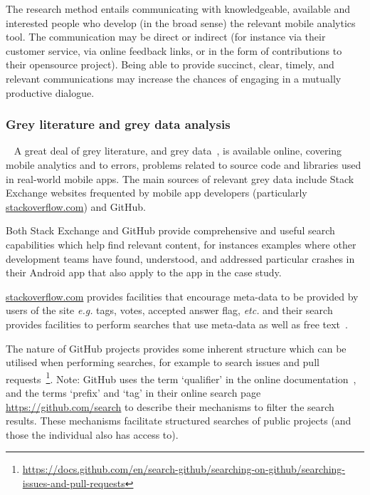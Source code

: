 The research method entails communicating with knowledgeable, available and interested people who develop (in the broad sense) the relevant mobile analytics tool. The communication may be direct or indirect (for instance via their customer service, via online feedback links, or in the form of contributions to their opensource project). Being able to provide succinct, clear, timely, and relevant communications may increase the chances of engaging in a mutually productive dialogue.

\subsubsection{Grey literature and grey data analysis}~\label{section-grey-literature-and-data-analysis-research-method}   
A great deal of grey literature, and grey data~\citep[pp 219-221]{banks2010_blog_posts_and_tweets_the_next_frontier_for_grey_literature}, is available online, covering mobile analytics and to errors, problems related to source code and libraries used in real-world mobile apps. The main sources of relevant grey data include Stack Exchange websites frequented by mobile app developers (particularly \href{https://stackoverflow.com/}{stackoverflow.com}) and GitHub. 

Both Stack Exchange and GitHub provide comprehensive and useful search capabilities which help find relevant content, for instances examples where other development teams have found, understood, and addressed particular crashes in their Android app that also apply to the app in the case study.

\href{https://stackoverflow.com/}{stackoverflow.com} provides facilities that encourage meta-data to be provided by users of the site \textit{e.g.} tags, votes, accepted answer flag, \textit{etc.} and their search provides facilities to perform searches that use meta-data as well as free text~\citep{stackoverflow2021_search_help}.

The nature of GitHub projects provides some inherent structure which can be utilised when performing searches, for example to search issues and pull requests~\footnote{\url{https://docs.github.com/en/search-github/searching-on-github/searching-issues-and-pull-requests}}. Note: GitHub uses the term `qualifier' in the online documentation~\citep{github2021_searching_code_github_docs}, and the terms `prefix' and `tag' in their online search page \url{https://github.com/search} to describe their mechanisms to filter the search results. These mechanisms facilitate structured searches of public projects (and those the individual also has access to).

